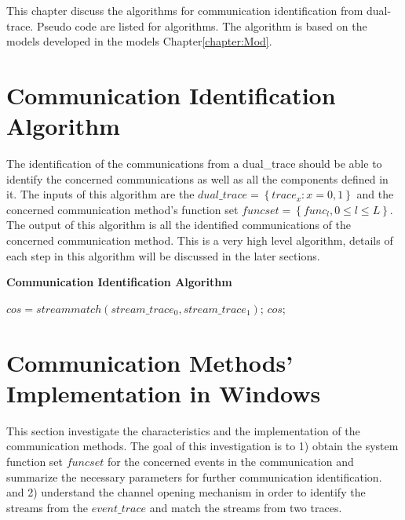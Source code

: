 

\label{chapter:alo}
This chapter discuss the algorithms for communication identification from dual-trace. Pseudo code are listed for algorithms. The algorithm is based on the models developed in the models Chapter\ref{chapter:Mod}.

\section{Communication Identification Algorithm}
The identification of the communications from a dual\_trace should be able to identify the concerned communications as well as all the components defined in it. The inputs of this algorithm are the $dual\_trace=\left\lbrace trace_{x}: x= 0,1 \right\rbrace $ and the concerned communication method's function set $funcset = \left \lbrace func_{l}, 0 \leqslant l \leqslant L\right\rbrace $. The output of this algorithm is all the identified communications of the concerned communication method. This is a very high level algorithm, details of each step in this algorithm will be discussed in the later sections.\par
\begin{algorithm}[H]
\DontPrintSemicolon
\caption{{\bf Communication Identification Algorithm} \label{endpointIdentAlg}}
$cos = streammatch(stream\_trace_{0}, stream\_trace_{1})$;\;
\KwRet $cos$;\;
\end{algorithm} 

\section{Communication Methods' Implementation in Windows}\label{windows}
This section investigate the characteristics and the implementation of the communication methods.  The goal of this investigation is to 1) obtain the system function set $funcset$ for the concerned events in the communication and summarize the necessary parameters for further communication identification. and 2) understand the channel opening mechanism in order to identify the streams from the $event\_trace$ and match the streams from two traces.

